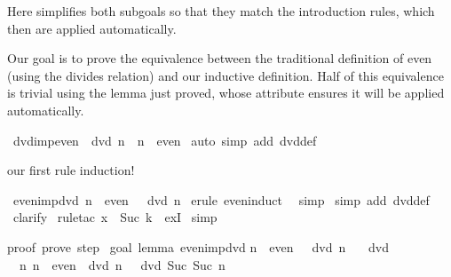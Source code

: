 \begin{isabellebody}
\begin{isamarkuptext}
Here  simplifies both subgoals so that they match the introduction
rules, which then are applied automatically.%
\end{isamarkuptext}%
%
\begin{isamarkuptext}%
Our goal is to prove the equivalence between the traditional definition
of even (using the divides relation) and our inductive definition.  Half of
this equivalence is trivial using the lemma just proved, whose 
attribute ensures it will be applied automatically.%
\end{isamarkuptext}%
\ dvd{\isacharunderscore}imp{\isacharunderscore}even{\isacharcolon}\ {\isachardoublequote}{\isacharhash}{}\ dvd\ n\ {\isasymLongrightarrow}\ n\ {\isasymin}\ even{\isachardoublequote}\isanewline
{}\ {\isacharparenleft}auto\ simp\ add{\isacharcolon}\ dvd{\isacharunderscore}def{\isacharparenright}\isanewline
{}%
\begin{isamarkuptext}%
our first rule induction!%
\end{isamarkuptext}%
\ even{\isacharunderscore}imp{\isacharunderscore}dvd{\isacharcolon}\ {\isachardoublequote}n\ {\isasymin}\ even\ {\isasymLongrightarrow}\ {\isacharhash}{}\ dvd\ n{\isachardoublequote}\isanewline
{}\ {\isacharparenleft}erule\ even{\isachardot}induct{\isacharparenright}\isanewline
\ \ simp\isanewline
{}\ {\isacharparenleft}simp\ add{\isacharcolon}\ dvd{\isacharunderscore}def{\isacharparenright}\isanewline
{}\ clarify\isanewline
{}\ {\isacharparenleft}rule{\isacharunderscore}tac\ x\ {\isacharequal}\ {\isachardoublequote}Suc\ k{\isachardoublequote}\ \ exI{\isacharparenright}\isanewline
{}\ simp\isanewline
{}%
\begin{isamarkuptext}%
proof\ {\isacharparenleft}prove{\isacharparenright}{\isacharcolon}\ step\ {}\isanewline
\isanewline
goal\ {\isacharparenleft}lemma\ even{\isacharunderscore}imp{\isacharunderscore}dvd{\isacharparenright}{\isacharcolon}\isanewline
n\ {\isasymin}\ even\ {\isasymLongrightarrow}\ {\isacharhash}{}\ dvd\ n\isanewline
\ {}{\isachardot}\ {\isacharhash}{}\ dvd\ {}\isanewline
\ {}{\isachardot}\ {\isasymAnd}n{\isachardot}\ {\isasymlbrakk}n\ {\isasymin}\ even{\isacharsemicolon}\ {\isacharhash}{}\ dvd\ n{\isasymrbrakk}\ {\isasymLongrightarrow}\ {\isacharhash}{}\ dvd\ Suc\ {\isacharparenleft}Suc\ n{\isacharparenright}


\end{isamarkuptext}
\end{isabellebody}
